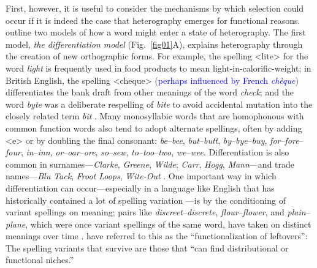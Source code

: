 \documentclass[doc,biblatex]{apa7}
\newcommand\newmaterial[1]{\textcolor{blue}{#1}}
\begin{document}
First, however, it is useful to consider the mechanisms by which selection could occur if it is indeed the case that heterography emerges for functional reasons. \textcite[pp.~325--326]{Berg:2021} outline two models of how a word might enter a state of heterography. The first model, \textit{the differentiation model} (Fig.~\ref{fig01}A), explains heterography through the creation of new orthographic forms. For example, the spelling <lite> for the word \textit{light} is frequently used in food products to mean light-in-calorific-weight; in British English, the spelling <cheque> (\newmaterial{perhaps influenced by French \textit{chèque}}) differentiates the bank draft from other meanings of the word \textit{check}; and the word \textit{byte} was a deliberate respelling of \textit{bite} to avoid accidental mutation into the closely related term \textit{bit} \parencite{Buchholz:1977}. Many monosyllabic words that are homophonous with common function words also tend to adopt alternate spellings, often by adding <e> or by doubling the final consonant: \textit{be}--\textit{bee}, \textit{but}--\textit{butt}, \textit{by}--\textit{bye}--\textit{buy}, \textit{for}--\textit{fore}--\textit{four}, \textit{in}--\textit{inn}, \textit{or}--\textit{oar}--\textit{ore}, \textit{so}--\textit{sew}, \textit{to}--\textit{too}--\textit{two}, \textit{we}--\textit{wee}. Differentiation is also common in surnames---\textit{Clarke}, \textit{Greene}, \textit{Wilde}; \textit{Carr}, \textit{Hogg}, \textit{Mann}---and trade names---\textit{Blu Tack}, \textit{Froot Loops}, \textit{Wite-Out} \parencite[§~6]{Carney:1994}. One important way in which differentiation can occur---especially in a language like English that has historically contained a lot of spelling variation \parencite{Nevalainen:2012, Stenroos:2016}---is by the conditioning of variant spellings on meaning; pairs like \textit{discreet}--\textit{discrete}, \textit{flour}--\textit{flower}, and \textit{plain}--\textit{plane}, which were once variant spellings of the same word, have taken on distinct meanings over time \parencite[§~5.4]{Carney:1994}. \textcite[p.~58]{Berg:2017} have referred to this as the ``functionalization of leftovers'': The spelling variants that survive are those that ``can find distributional or functional niches.''
\end{document}
